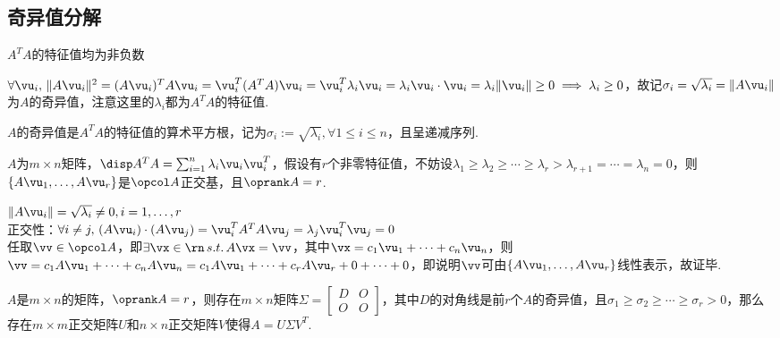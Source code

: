 \subsection{奇异值分解}%
\begin{theorem}
$A^TA$的特征值均为非负数
\end{theorem}
\begin{analysis}
$\forall\vu_i,\,\|A\vu_i\|^2=(A\vu_i)^TA\vu_i=\vu_i^T(A^TA)\vu_i=\vu_i^T\lambda_i\vu_i=\lambda_i\vu_i\cdot\vu_i=\lambda_i\|\vu_i\|\geq 0\implies \lambda_i\geq 0$，故记$\sigma_i=\sqrt{\lambda_i}=\|A\vu_i\|$为$A$的奇异值，注意这里的$\lambda_i$都为$A^TA$的特征值.
\end{analysis}
\begin{definition}[奇异值]
$A$的奇异值是$A^TA$的特征值的算术平方根，记为$\sigma_i:=\sqrt{\lambda_i},\forall 1\leq i\leq n$，且呈递减序列.
\end{definition}
\begin{theorem}
$A$为$m\times n$矩阵，$\disp A^TA=\sum_{i=1}^n\lambda_i\vu_i\vu_i^T$，假设有$r$个非零特征值，不妨设$\lambda_1\geq\lambda_2\geq\cdots\geq\lambda_r>\lambda_{r+1}=\cdots=\lambda_n=0$，则$\{A\vu_1,\dots,A\vu_r\}$是$\opcol A$正交基，且$\oprank A=r$.
\end{theorem}
\begin{analysis}
$\|A\vu_i\|=\sqrt{\lambda_i}\ne 0,i=1,\dots,r$\\
正交性：$\forall i\ne j,\,(A\vu_i)\cdot(A\vu_j)=\vu_i^TA^TA\vu_j=\lambda_j\vu_i^T\vu_j=0$\\
任取$\vv\in\opcol A$，即$\exists\vx\in\rn\,s.t.\,A\vx=\vv$，其中$\vx=c_1\vu_1+\cdots+c_n\vu_n$，则$\vv=c_1A\vu_1+\cdots+c_nA\vu_n=c_1A\vu_1+\cdots+c_rA\vu_r+0+\cdots+0$，即说明$\vv$可由$\{A\vu_1,\dots,A\vu_r\}$线性表示，故证毕.
\end{analysis}
\begin{theorem}
$A$是$m\times n$的矩阵，$\oprank A=r$，则存在$m\times n$矩阵$\Sigma=\begin{bmatrix}D&O\\O&O\end{bmatrix}$，其中$D$的对角线是前$r$个$A$的奇异值，且$\sigma_1\geq\sigma_2\geq\cdots\geq\sigma_r>0$，那么存在$m\times m$正交矩阵$U$和$n\times n$正交矩阵$V$使得$A=U\Sigma V^T$.
\end{theorem}
